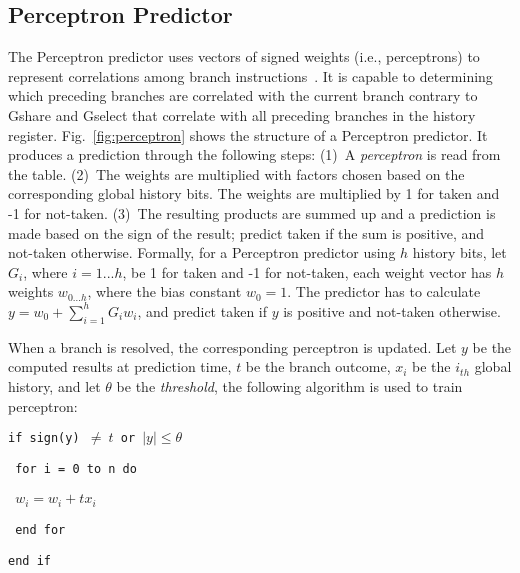 \subsection{Perceptron Predictor}
\label{sec:background:dirpred:perceptron}
The Perceptron predictor uses vectors of signed weights (i.e., perceptrons) to represent correlations among branch instructions~\cite{perceptron}. It is capable to determining which preceding branches are correlated with the current branch contrary to Gshare and Gselect that correlate with all preceding branches in the history register. Fig.~\ref{fig:perceptron} shows the structure of a Perceptron predictor. It produces a prediction through the following steps: (1)~A \textit{perceptron} is read from the table. (2)~The weights are multiplied with factors chosen based on the  corresponding global history bits. The weights are multiplied by 1 for taken and -1 for not-taken. (3)~The resulting products are summed up and a prediction is made based on the sign of the result; predict taken if the sum is positive, and not-taken otherwise. Formally, for a Perceptron predictor using $h$ history bits, let $G_i$, where $i = 1...h$, be 1 for taken and -1 for not-taken, each weight vector has $h$ weights $w_{0...h}$, where the bias constant $w_0 = 1$. The predictor has to calculate $y = w_0 + \sum_{i=1}^{h} G_iw_i$, and predict taken if $y$ is positive and not-taken otherwise.

When a branch is resolved, the corresponding perceptron is updated. Let $y$ be the computed results at prediction time, $t$ be the branch outcome, $x_i$ be the $i_{th}$ global history, and let $\theta$ be the \textit{threshold}, the following algorithm is used to train perceptron:\vspace{8 mm}

\begin{spacing}{1} 
\texttt{if sign(y) $\neq\ t$ or $\left| y \right| \leq \theta$}

\texttt{\hspace{8mm} for i = 0 to n do}

\texttt{\hspace{16mm} $w_i = w_i + tx_i$}

\texttt{\hspace{8mm} end for}

\texttt{end if}
\end{spacing}
\vspace{8 mm}

